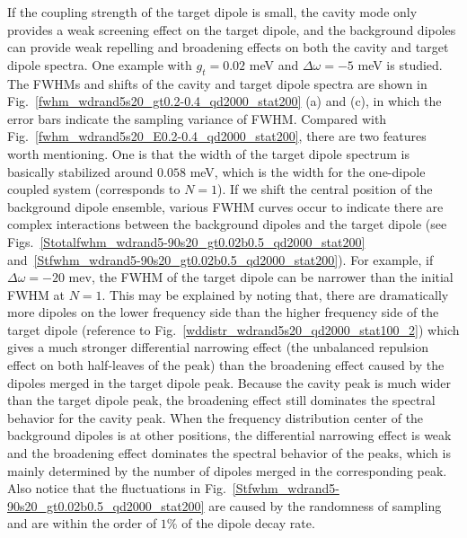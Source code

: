 If the coupling strength of the target dipole is small, the cavity mode only provides a weak screening effect on the target dipole, and the background dipoles can provide weak repelling and broadening effects on both the cavity and target dipole spectra. One example with $g_t=0.02$ meV and $\Delta\omega=-5$ meV is studied. The FWHMs and shifts of the cavity and target dipole spectra are shown in Fig.~\ref{fwhm_wdrand5s20_gt0.2-0.4_qd2000_stat200} (a) and (c), in which the error bars indicate the sampling variance of FWHM. Compared with Fig.~\ref{fwhm_wdrand5s20_E0.2-0.4_qd2000_stat200}, there are two features worth mentioning. One is that the width of the target dipole spectrum is basically stabilized around $0.058$ meV, which is the width for the one-dipole coupled system (corresponds to $N=1$). If we shift the central position of the background dipole ensemble, various FWHM curves occur to indicate there are complex interactions between the background dipoles and the target dipole (see Figs.~\ref{Stotalfwhm_wdrand5-90s20_gt0.02b0.5_qd2000_stat200} and~\ref{Stfwhm_wdrand5-90s20_gt0.02b0.5_qd2000_stat200}). For example, if $\Delta\omega=-20$ mev, the FWHM of the target dipole can be narrower than the initial FWHM at $N=1$. This may be explained by noting that, there are dramatically more dipoles on the lower frequency side than the higher frequency side of the target dipole (reference to Fig.~\ref{wddistr_wdrand5s20_qd2000_stat100_2}) which gives a much stronger differential narrowing effect (the unbalanced repulsion effect on both half-leaves of the peak) than the broadening effect caused by the dipoles merged in the target dipole peak. Because the cavity peak is much wider than the target dipole peak, the broadening effect still dominates the spectral behavior for the cavity peak. When the frequency distribution center of the background dipoles is at other positions, the differential narrowing effect is weak and the broadening effect dominates the spectral behavior of the peaks, which is mainly determined by the number of dipoles merged in the corresponding peak. Also notice that the fluctuations in Fig.~\ref{Stfwhm_wdrand5-90s20_gt0.02b0.5_qd2000_stat200} are caused by the randomness of sampling and are within the order of $1\%$ of the dipole decay rate.

